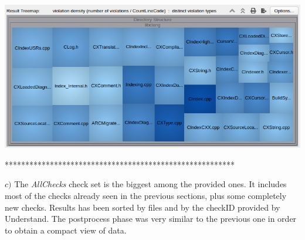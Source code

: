 \begin{minipage}{\linewidth}
	\includegraphics[width=\textwidth]{img/SciToolsViolationsRatio.png}
\end{minipage}

\pagebreak

********************************************************

\hspace{-0.6cm} \textbf{$c)$}  
The \textsl{AllChecks} check set is the biggest among the provided ones. It includes most of the checks already seen in the previous sections, plus some completely new checks.\newline
Results has been sorted by files and by the checkID provided by Understand. The postprocess phase was very similar to the previous one in order to obtain a compact view of data.\newline

